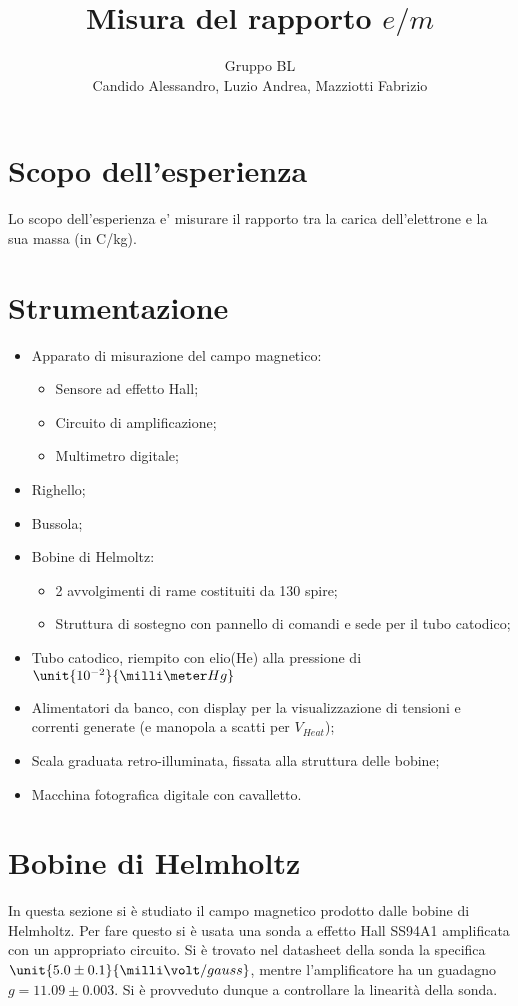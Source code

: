 \documentclass[10pt,a4paper]{article}
\title{Misura del rapporto $e/m$}
\author{Gruppo BL \\ Candido Alessandro, Luzio Andrea, Mazziotti Fabrizio}
\begin{document}
\maketitle

\section{Scopo dell'esperienza}
Lo scopo dell’esperienza e’ misurare il rapporto tra la carica dell’elettrone e la sua massa (in C/kg).

\section{Strumentazione}
\begin{itemize}
	\item Apparato di misurazione del campo magnetico:
		\begin{itemize}
			\item Sensore ad effetto Hall;
			\item Circuito di amplificazione;
			\item Multimetro digitale;
		\end{itemize}
	\item Righello;
	\item Bussola;
	\item Bobine di Helmoltz:
		\begin{itemize}
			\item 2 avvolgimenti di rame costituiti da 130 spire;
			\item Struttura di sostegno con pannello di comandi e sede per il tubo catodico;
		\end{itemize}
	\item Tubo catodico, riempito con elio(He) alla pressione di $\unit{10^{-2}}{\milli\meter Hg}$
	\item Alimentatori da banco, con display per la visualizzazione di tensioni e correnti generate (e manopola a scatti per $V_{Heat}$);
	\item Scala graduata retro-illuminata, fissata alla struttura delle bobine;
	\item Macchina fotografica digitale con cavalletto.
\end{itemize}

\section{Bobine di Helmholtz}
In questa sezione si è studiato il campo magnetico prodotto dalle bobine di Helmholtz. Per fare questo si è usata una sonda a effetto Hall SS94A1 amplificata con un appropriato circuito. Si è trovato nel datasheet della sonda la specifica $\unit{5.0 \pm 0.1}{\milli\volt/gauss}$, mentre l'amplificatore ha un guadagno $g = 11.09 \pm 0.003$. Si è provveduto dunque a controllare la linearità della sonda.
\end{document}
